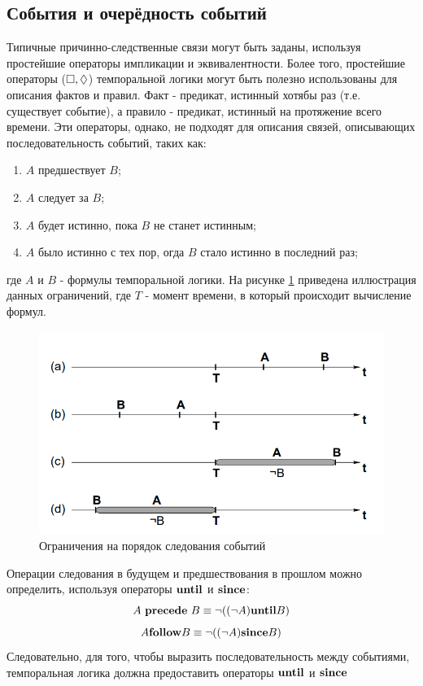 		\subsection{События и очерёдность событий}
		 Типичные причинно-следственные связи могут быть заданы, используя простейшие операторы импликации и эквивалентности. Более того, простейшие операторы ($ \square, \lozenge $) темпоральной логики могут быть полезно использованы для описания фактов и правил. Факт - предикат, истинный хотябы раз (т.е. существует событие), а правило - предикат, истинный на протяжение всего времени. Эти операторы, однако, не подходят для описания связей, описывающих последовательность событий, таких как:
		 \begin{enumerate}
		 	\item $ A $ предшествует $ B $;
		 	\item $ A $ следует за $ B $;
		 	\item $ A $ будет истинно, пока $ B $ не станет истинным;
		 	\item $ A $ было истинно с тех пор, огда $ B $ стало истинно в последний раз;
		 \end{enumerate}
	 	где $ A $ и $ B $ - формулы темпоральной логики.
	 	На рисунке \ref{fig:ordering-constraints} приведена иллюстрация данных ограничений, где $ T $ - момент времени, в который происходит вычисление формул.
		\begin{figure}[h]
			\centering
			\includegraphics[width=0.7\linewidth]{images/ordering-constraints}
			\caption{Ограничения на порядок следования событий}
			\label{fig:ordering-constraints}
		\end{figure}
	
		Операции следования в будущем и предшествования в прошлом можно определить, используя операторы $ \text{\textbf{until}} $ и $ \text{\textbf{since}} $:
		\[ A \text{~\textbf{precede}~} B \equiv \neg((\neg A) \text{\textbf{until}} B) \]
		\[ A \text{\textbf{follow}} B \equiv \neg((\neg A) \text{\textbf{since}} B) \]
		Следовательно, для того, чтобы выразить последовательность между событиями, темпоральная логика должна предоставить операторы $ \text{\textbf{until}} $ и $ \text{\textbf{since}} $
		
